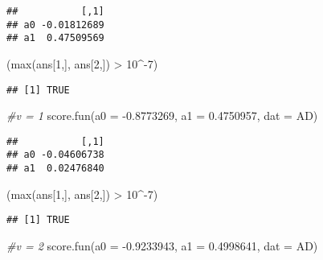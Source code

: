 \documentclass[
]{article}
\newenvironment{Shaded}{\begin{snugshade}}{\end{snugshade}}
\newcommand{\AttributeTok}[1]{\textcolor[rgb]{0.77,0.63,0.00}{#1}}
\newcommand{\CommentTok}[1]{\textcolor[rgb]{0.56,0.35,0.01}{\textit{#1}}}
\newcommand{\DecValTok}[1]{\textcolor[rgb]{0.00,0.00,0.81}{#1}}
\newcommand{\FloatTok}[1]{\textcolor[rgb]{0.00,0.00,0.81}{#1}}
\newcommand{\FunctionTok}[1]{\textcolor[rgb]{0.00,0.00,0.00}{#1}}
\newcommand{\NormalTok}[1]{#1}
\newcommand{\SpecialCharTok}[1]{\textcolor[rgb]{0.00,0.00,0.00}{#1}}
\begin{document}
\begin{verbatim}
##           [,1]
## a0 -0.01812689
## a1  0.47509569
\end{verbatim}

\begin{Shaded}
\begin{Highlighting}[]
\NormalTok{(}\FunctionTok{max}\NormalTok{(ans[}\DecValTok{1}\NormalTok{,], ans[}\DecValTok{2}\NormalTok{,]) }\SpecialCharTok{\textgreater{}} \DecValTok{10}\SpecialCharTok{\^{}{-}}\DecValTok{7}\NormalTok{)}
\end{Highlighting}
\end{Shaded}

\begin{verbatim}
## [1] TRUE
\end{verbatim}

\begin{Shaded}
\begin{Highlighting}[]
\CommentTok{\#v = 1}
\FunctionTok{score.fun}\NormalTok{(}\AttributeTok{a0 =} \SpecialCharTok{{-}}\FloatTok{0.8773269}\NormalTok{, }\AttributeTok{a1 =} \FloatTok{0.4750957}\NormalTok{, }\AttributeTok{dat =}\NormalTok{ AD)}
\end{Highlighting}
\end{Shaded}

\begin{verbatim}
##           [,1]
## a0 -0.04606738
## a1  0.02476840
\end{verbatim}

\begin{Shaded}
\begin{Highlighting}[]
\NormalTok{(}\FunctionTok{max}\NormalTok{(ans[}\DecValTok{1}\NormalTok{,], ans[}\DecValTok{2}\NormalTok{,]) }\SpecialCharTok{\textgreater{}} \DecValTok{10}\SpecialCharTok{\^{}{-}}\DecValTok{7}\NormalTok{)}
\end{Highlighting}
\end{Shaded}

\begin{verbatim}
## [1] TRUE
\end{verbatim}

\begin{Shaded}
\begin{Highlighting}[]
\CommentTok{\#v = 2}
\FunctionTok{score.fun}\NormalTok{(}\AttributeTok{a0 =} \SpecialCharTok{{-}}\FloatTok{0.9233943}\NormalTok{, }\AttributeTok{a1 =} \FloatTok{0.4998641}\NormalTok{, }\AttributeTok{dat =}\NormalTok{ AD)}
\end{Highlighting}
\end{Shaded}
\end{document}
